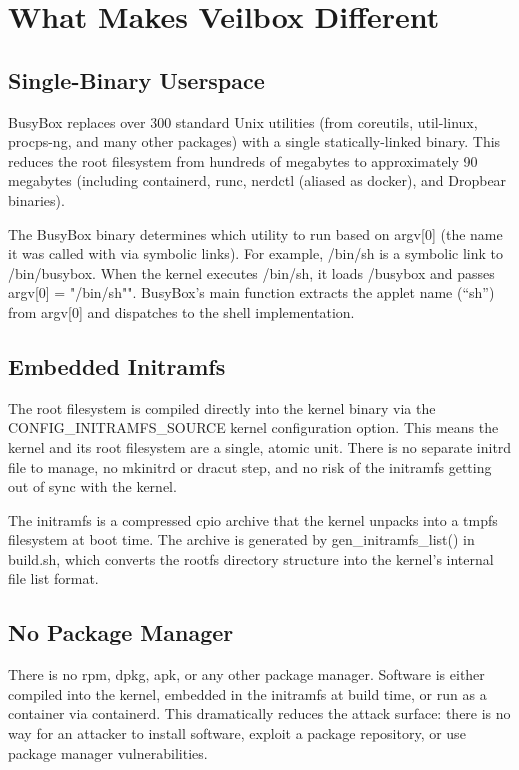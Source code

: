 \section{What Makes Veilbox Different}

\subsection{Single-Binary Userspace}

BusyBox replaces over 300 standard Unix utilities (from coreutils, util-linux,
procps-ng, and many other packages) with a single statically-linked binary.
This reduces the root filesystem from hundreds of megabytes to approximately
90 megabytes (including containerd, runc, nerdctl (aliased as docker), and Dropbear binaries).

The BusyBox binary determines which utility to run based on argv{[}0{]}
(the name it was called with via symbolic links). For example, /bin/sh is a
symbolic link to /bin/busybox. When the kernel executes /bin/sh, it loads
/busybox and passes argv{[}0{]} = "/bin/sh"". BusyBox's main function
extracts the applet name (``sh'') from argv{[}0{]} and dispatches to the
shell implementation.

\subsection{Embedded Initramfs}

The root filesystem is compiled directly into the kernel binary via the
CONFIG\_INITRAMFS\_SOURCE kernel configuration option. This means the kernel
and its root filesystem are a single, atomic unit. There is no separate
initrd file to manage, no mkinitrd or dracut step, and no risk of the
initramfs getting out of sync with the kernel.

The initramfs is a compressed cpio archive that the kernel unpacks into a
tmpfs filesystem at boot time. The archive is generated by
gen\_initramfs\_list() in build.sh, which converts the rootfs directory
structure into the kernel's internal file list format.

\subsection{No Package Manager}

There is no rpm, dpkg, apk, or any other package manager. Software is
either compiled into the kernel, embedded in the initramfs at build time,
or run as a container via containerd. This dramatically reduces the attack
surface: there is no way for an attacker to install software, exploit a
package repository, or use package manager vulnerabilities.

